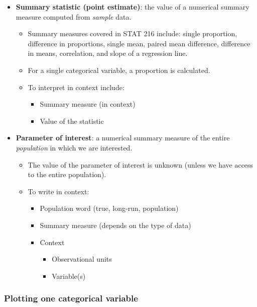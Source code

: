\documentclass[
]{report}
\begin{document}
\begin{itemize}
\item
  \textbf{Summary statistic (point estimate)}: the value of a numerical summary measure computed from \emph{sample} data.

  \begin{itemize}
  \item
    Summary measures covered in STAT 216 include: single proportion, difference in proportions, single mean, paired mean difference, difference in means, correlation, and slope of a regression line.
  \item
    For a single categorical variable, a proportion is calculated.
  \item
    To interpret in context include:

    \begin{itemize}
    \item
      Summary measure (in context)
    \item
      Value of the statistic
    \end{itemize}
  \end{itemize}
\item
  \textbf{Parameter of interest}: a numerical summary measure of the entire \emph{population} in which we are interested.

  \begin{itemize}
  \item
    The value of the parameter of interest is unknown (unless we have access to the entire population).
  \item
    To write in context:

    \begin{itemize}
    \item
      Population word (true, long-run, population)
    \item
      Summary measure (depends on the type of data)
    \item
      Context

      \begin{itemize}
      \item
        Observational units
      \item
        Variable(s)
      \end{itemize}
    \end{itemize}
  \end{itemize}
\end{itemize}

\subsubsection*{Plotting one categorical variable}\label{plotting-one-categorical-variable}
\end{document}
